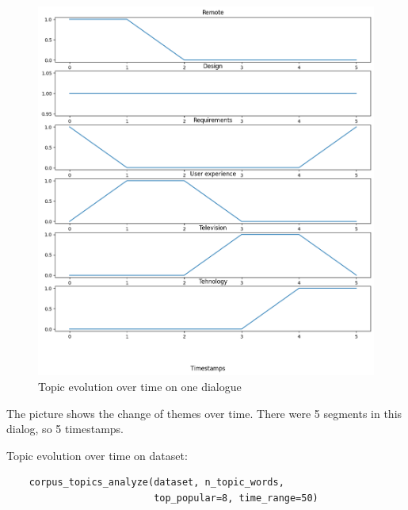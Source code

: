 \documentclass[PMI,VKR]{HSEUniversity}
\begin{document}
\begin{figure}[h]
    \centering
    \includegraphics[scale=0.5]{img/output.png}
    \caption{Topic evolution over time on one dialogue}
\end{figure}

The picture shows the change of themes over time. 
There were 5 segments in this dialog, so 5 timestamps. \\

\begin{center}
    \centering
    Topic evolution over time on dataset:
\end{center}

\begin{lstlisting}
    corpus_topics_analyze(dataset, n_topic_words,
                          top_popular=8, time_range=50)
\end{lstlisting}
\end{document}
